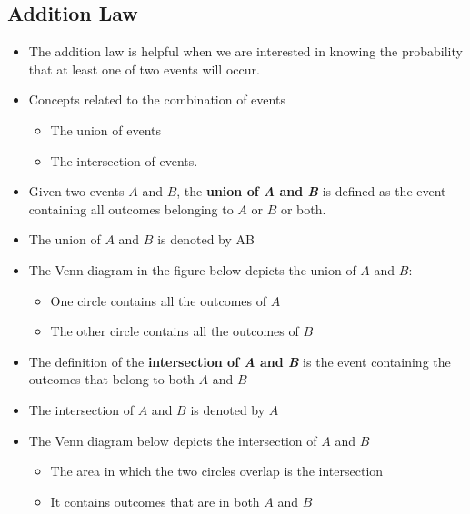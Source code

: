 \documentclass{report}
\begin{document}
\subsection{Addition Law}
\begin{itemize}
  \item The addition law is helpful when we are interested in knowing the probability that at least one of two events will occur. 
  \item Concepts related to the combination of events
    \begin{itemize}[label=$\circ$]
    \item The union of events 
    \item The intersection of events.
  \end{itemize}
\item Given two events $A$ and $B$, the \textbf{union of \textit{A} and \textit{B}} is defined as the event containing all outcomes belonging to $A$ or $B$ or both.
\item The union of $A$ and $B$ is denoted by AB
\item The Venn diagram in the figure below depicts the union of $A$ and $B$:
  \begin{itemize}[label=$\circ$]
    \item One circle contains all the outcomes of $A$ 
    \item The other circle contains all the outcomes of $B$
  \end{itemize}
\bigbreak \noindent
\begin{figure}[ht]
    \centering
\end{figure}
\item The definition of the \textbf{intersection of \textit{A} and \textit{B}} is the event containing the outcomes that belong to both $A$ and $B$
\item The intersection of $A$ and $B$ is denoted by $A$
\item The Venn diagram below depicts the intersection of $A$ and $B$
  \begin{itemize}[label=$\circ$]
    \item The area in which the two circles overlap is the intersection 
    \item It contains outcomes that are in both $A$ and $B$
  \end{itemize}
  \bigbreak \noindent
\begin{figure}[ht]
    \centering
    \hspace{19mm}

\end{figure}
\end{itemize}
\end{document}
